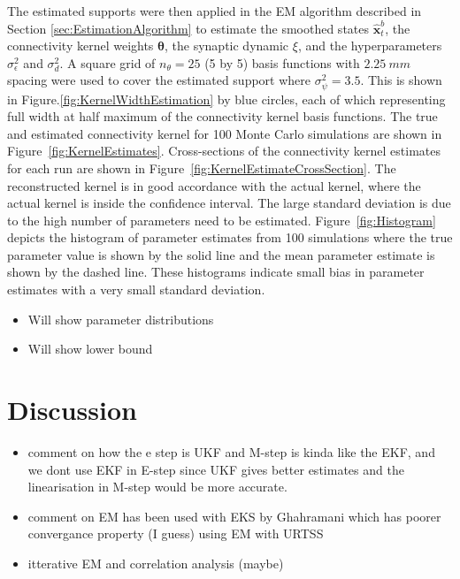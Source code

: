 \documentclass[]{article}
\begin{document}
The estimated supports were then applied in the EM algorithm described in Section \ref{sec:EstimationAlgorithm} to estimate the smoothed states $\hat{\mathbf x}_t^b$, the connectivity kernel weights $\boldsymbol\theta$, the synaptic dynamic $\xi$, and the hyperparameters $\sigma_{\epsilon}^2$ and $\sigma^2_d$. A  square grid of $n_{\theta}=25$ (5 by 5) basis functions with $2.25~mm$ spacing were used to cover the estimated support where $\sigma_{\psi}^2=3.5$. This is shown in Figure.\ref{fig:KernelWidthEstimation} by blue circles, each of which representing full width at half maximum of the connectivity kernel basis functions. The true and estimated connectivity kernel for 100 Monte Carlo simulations are shown in Figure~\ref{fig:KernelEstimates}. Cross-sections of the connectivity kernel estimates for each run are shown in Figure~\ref{fig:KernelEstimateCrossSection}. The reconstructed kernel is in good accordance with the actual kernel, where the actual kernel is inside the confidence interval. The large standard deviation is due to the high number of parameters need to be estimated. Figure~\ref{fig:Histogram} depicts the histogram of parameter estimates from 100 simulations where the true parameter value is shown by the solid line and the mean parameter estimate is shown by the dashed line. These histograms indicate small bias in parameter estimates with a very small standard deviation.


 
\begin{itemize}
	\item Will show parameter distributions
	\item Will show lower bound
      \end{itemize}


\section{Discussion}

\begin{itemize}
	\item comment on how the e step is UKF and M-step is kinda like the EKF, and we dont use EKF in E-step since UKF gives better estimates and the linearisation in M-step would be more accurate. 
	\item comment on EM has been used with EKS by Ghahramani which has poorer convergance property (I guess) using EM with URTSS
	\item itterative EM and correlation analysis (maybe)
\end{itemize}
\end{document}
